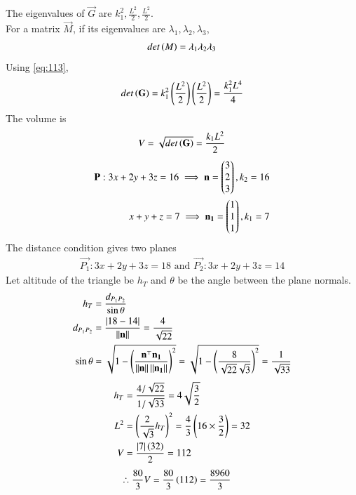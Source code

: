 \documentclass[journal]{IEEEtran}
\begin{document}
The eigenvalues of $\vec{G}$ are $k_1^2, \frac{L^2}{2}, \frac{L^2}{2}$. \\
For a matrix $\vec{M}$, if its eigenvalues are $\lambda_1, \lambda_2, \lambda_3$,
\begin{align}
	det\left(M\right) = \lambda_1\lambda_2\lambda_3 \label{eq:113}
\end{align}
Using \eqref{eq:113},
\begin{align}
    det\left(\mathbf{G}\right) = k_1^2 \left(\frac{L^2}{2}\right) \left(\frac{L^2}{2}\right) = \frac{k_1^2 L^4}{4}
\end{align}
The volume is 
\begin{align}
    V = \sqrt{det\left(\mathbf{G}\right)} = \frac{k_1 L^2}{2}
\end{align}
\begin{align}
    \mathbf{P}: 3x+2y+3z=16 \implies \mathbf{n} = \begin{pmatrix}3 \\ 2 \\ 3\end{pmatrix}, k_2=16 \\
    x+y+z=7 \implies \mathbf{n_1} = \begin{pmatrix}1 \\ 1 \\ 1\end{pmatrix}, k_1=7 \\
\end{align}
The distance condition gives two planes
\begin{align}
	\vec{P_1}: 3x+2y+3z=18\text{ and }\vec{P_2}: 3x+2y+3z=14
\end{align}
Let altitude of the triangle be $h_T$ and $\theta$ be the angle between the plane normals.
\begin{align}
    h_T &= \frac{d_{P_1P_2}}{\sin\theta} \\
    d_{P_1P_2} &= \frac{\left\vert18-14\right\vert}{\left\lVert\mathbf{n}\right\rVert} = \frac{4}{\sqrt{22}} \\
    \sin\theta &= \sqrt{1 - \left(\frac{\mathbf{n}^\top\mathbf{n_1}}{\left\lVert\mathbf{n}\right\rVert\left\lVert\mathbf{n_1}\right\rVert}\right)^2} = \sqrt{1 - \left(\frac{8}{\sqrt{22}\sqrt{3}}\right)^2} = \frac{1}{\sqrt{33}}
\end{align}
\begin{align}
    h_T &= \frac{4/\sqrt{22}}{1/\sqrt{33}} = 4\sqrt{\frac{3}{2}} \\
    L^2 &= \left(\frac{2}{\sqrt{3}}h_T\right)^2 = \frac{4}{3}\left(16 \times \frac{3}{2}\right) = 32 \\
    V &= \frac{\left\vert7\right\vert\left(32\right)}{2} = 112
\end{align}
\begin{align}
    \therefore \frac{80}{3}V &= \frac{80}{3}\left(112\right) = \frac{8960}{3}
\end{align}
\end{document}

